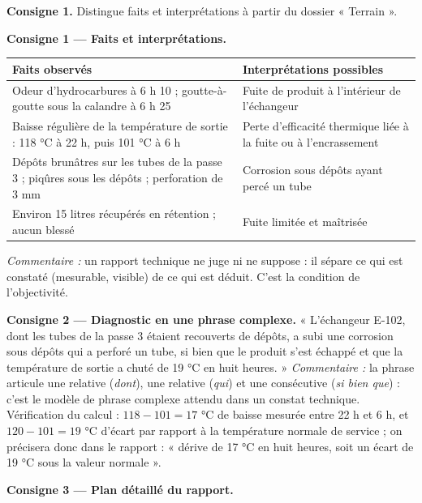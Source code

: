 \documentclass[11pt]{article}
\newcounter{popsec}
\newcounter{popsub}
\newcommand{\courssub}[1]{%
  \stepcounter{popsub}%
  \par\vspace{9pt}\noindent{\popxbold\fontsize{11.5}{13}\selectfont\color{popink}{\color{poporange}\thepopsec.\thepopsub}\hspace{6pt}#1}\par\nopagebreak\vspace{4pt}
}
\begin{document}
\courssub{Démarche et corrigé commenté}

\begin{exoresolu}
\textbf{Consigne 1.} Distingue faits et interprétations à partir du dossier « Terrain ».

\tcblower

\textbf{Consigne 1 — Faits et interprétations.}

\begin{center}
\begin{tabularx}{\linewidth}{|X|X|}\hline
\rowcolor{popblueL}
Faits observés & Interprétations possibles \\ \hline
Odeur d'hydrocarbures à 6 h 10 ; goutte-à-goutte sous la calandre à 6 h 25 & Fuite de produit à l'intérieur de l'échangeur \\ \hline
Baisse régulière de la température de sortie : 118 °C à 22 h, puis 101 °C à 6 h & Perte d'efficacité thermique liée à la fuite ou à l'encrassement \\ \hline
Dépôts brunâtres sur les tubes de la passe 3 ; piqûres sous les dépôts ; perforation de 3 mm & Corrosion sous dépôts ayant percé un tube \\ \hline
Environ 15 litres récupérés en rétention ; aucun blessé & Fuite limitée et maîtrisée \\ \hline
\end{tabularx}
\end{center}

\emph{Commentaire :} un rapport technique ne juge ni ne suppose : il sépare ce qui est constaté (mesurable, visible) de ce qui est déduit. C'est la condition de l'objectivité.

\textbf{Consigne 2 — Diagnostic en une phrase complexe.}
« L'échangeur E-102, dont les tubes de la passe 3 étaient recouverts de dépôts, a subi une corrosion sous dépôts qui a perforé un tube, si bien que le produit s'est échappé et que la température de sortie a chuté de 19 °C en huit heures. »
\emph{Commentaire :} la phrase articule une relative (\emph{dont}), une relative (\emph{qui}) et une consécutive (\emph{si bien que}) : c'est le modèle de phrase complexe attendu dans un constat technique. Vérification du calcul : $118 - 101 = 17$ °C de baisse mesurée entre 22 h et 6 h, et $120 - 101 = 19$ °C d'écart par rapport à la température normale de service ; on précisera donc dans le rapport : « dérive de 17 °C en huit heures, soit un écart de 19 °C sous la valeur normale ».

\textbf{Consigne 3 — Plan détaillé du rapport.}


\end{exoresolu}
\end{document}
